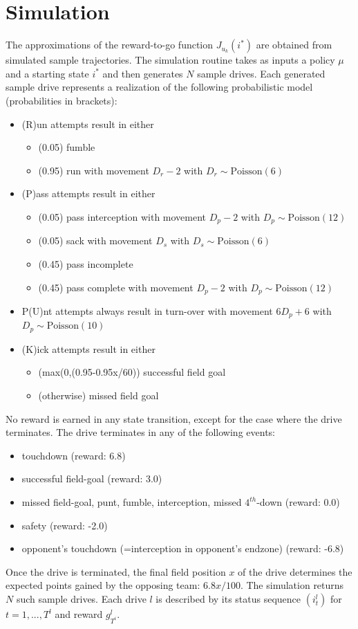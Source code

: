 \documentclass[11pt, oneside]{article}   	%
\begin{document}
\section{Simulation}
The approximations of the reward-to-go function $J_{u_k}(i^*)$ are obtained from simulated sample trajectories. The simulation routine takes as inputs a policy $\mu$ and a starting state $i^*$ and then generates $N$ sample drives. Each generated sample drive represents a realization of the following probabilistic model (probabilities in brackets):
\begin{itemize}
\item (R)un attempts result in either
\begin{itemize}
\item (0.05) fumble
\item (0.95) run with movement $D_r -2$ with $D_r \sim \text{Poisson}(6)$
\end{itemize}
\item (P)ass attempts result in either
\begin{itemize}
\item (0.05) pass interception with movement $D_p -2$ with $D_p \sim \text{Poisson}(12)$
\item (0.05) sack with movement $D_s$ with $D_s \sim \text{Poisson}(6)$
\item (0.45) pass incomplete
\item (0.45) pass complete with movement $D_p -2$ with $D_p \sim \text{Poisson}(12)$
\end{itemize}
\item P(U)nt attempts always result in turn-over with movement $6 D_p + 6$ with $D_p \sim \text{Poisson}(10)$ 
\item (K)ick attempts result in either
\begin{itemize}
\item (max(0,(0.95-0.95x/60)) successful field goal
\item (otherwise) missed field goal
\end{itemize}
\end{itemize}
No reward is earned in any state transition, except for the case where the drive terminates. The drive terminates in any of the following events:
\begin{itemize}
\item touchdown (reward: 6.8)
\item successful field-goal (reward: 3.0)
\item missed field-goal, punt, fumble, interception, missed $4^{th}$-down (reward: 0.0)
\item safety (reward: -2.0)
\item opponent's touchdown (=interception in opponent's endzone) (reward: -6.8)
\end{itemize}
Once the drive is terminated, the final field position $x$ of the drive determines the expected points gained by the opposing team: $6.8x/100$. 
The simulation returns $N$ such sample drives. Each drive $l$ is described by its status sequence $(i_t^l)$ for $t=1,...,T^l$ and reward $g_{T^i}^l$.
\end{document}
